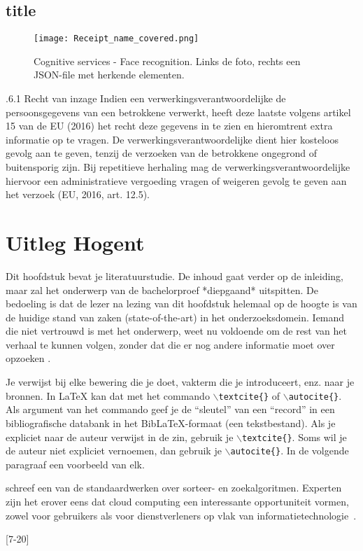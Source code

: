 \subsection{title}

\begin{figure}[h]
	\texttt{[image: Receipt\_name\_covered.png]}
	\caption{Cognitive services - Face recognition. Links de foto, rechts een JSON-file met herkende elementen.}
	\label{fig:receipt}
\end{figure}

.6.1 Recht van inzage
Indien een verwerkingsverantwoordelijke de persoonsgegevens van een betrokkene verwerkt, heeft deze laatste volgens artikel 15 van de EU (2016) het recht deze gegevens in te
zien en hieromtrent extra informatie op te vragen.
De verwerkingsverantwoordelijke dient hier kosteloos gevolg aan te geven, tenzij de
verzoeken van de betrokkene ongegrond of buitensporig zijn. Bij repetitieve herhaling
mag de verwerkingsverantwoordelijke hiervoor een administratieve vergoeding vragen of
weigeren gevolg te geven aan het verzoek (EU, 2016, art. 12.5).



\section{{Uitleg Hogent}}
Dit hoofdstuk bevat je literatuurstudie. De inhoud gaat verder op de inleiding, maar zal het onderwerp van de bachelorproef *diepgaand* uitspitten. De bedoeling is dat de lezer na lezing van dit hoofdstuk helemaal op de hoogte is van de huidige stand van zaken (state-of-the-art) in het onderzoeksdomein. Iemand die niet vertrouwd is met het onderwerp, weet nu voldoende om de rest van het verhaal te kunnen volgen, zonder dat die er nog andere informatie moet over opzoeken \autocite{Pollefliet2011}.

Je verwijst bij elke bewering die je doet, vakterm die je introduceert, enz. naar je bronnen. In \LaTeX{} kan dat met het commando \texttt{$\backslash${textcite\{\}}} of \texttt{$\backslash${autocite\{\}}}. Als argument van het commando geef je de ``sleutel'' van een ``record'' in een bibliografische databank in het Bib\LaTeX{}-formaat (een tekstbestand). Als je expliciet naar de auteur verwijst in de zin, gebruik je \texttt{$\backslash${}textcite\{\}}.
Soms wil je de auteur niet expliciet vernoemen, dan gebruik je \texttt{$\backslash${}autocite\{\}}. In de volgende paragraaf een voorbeeld van elk.
\textcite{Lusignan2014} \textcite{ronnie}

\textcite{Knuth1998} schreef een van de standaardwerken over sorteer- en zoekalgoritmen. Experten zijn het erover eens dat cloud computing een interessante opportuniteit vormen, zowel voor gebruikers als voor dienstverleners op vlak van informatietechnologie~\autocite{Creeger2009}.

[7-20]
